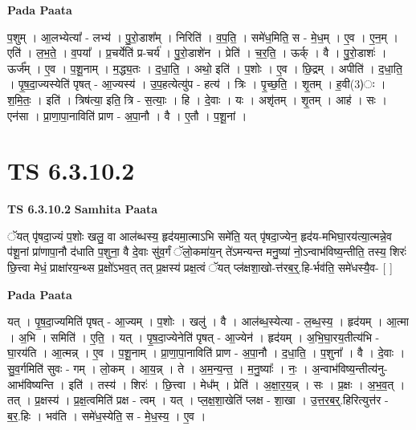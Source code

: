 \documentclass[17pt]{extarticle}
\begin{document}
\textbf{Pada Paata} \newline

प॒शुम् । आ॒लभ्येत्या᳚ - लभ्य॑ । पु॒रो॒डाश᳚म् । निरिति॑ । व॒प॒ति॒ । समे॑ध॒मिति॒ स - मे॒ध॒म् । ए॒व । ए॒न॒म् । एति॑ । ल॒भ॒ते॒ । व॒पया᳚ । प्र॒चर्येति॑ प्र-चर्य॑ । पु॒रो॒डाशे॑न । प्रेति॑ । च॒र॒ति॒ । ऊर्क् । वै । पु॒रो॒डाशः॑ । ऊर्ज᳚म् । ए॒व । प॒शू॒नाम् । म॒द्ध्य॒तः । द॒धा॒ति॒ । अथो॒ इति॑ । प॒शोः । ए॒व । छि॒द्रम् । अपीति॑ । द॒धा॒ति॒ । पृ॒ष॒दा॒ज्यस्येति॑ पृषत् - आ॒ज्यस्य॑ । उ॒प॒हत्येत्यु॑प - हत्य॑ । त्रिः । पृ॒च्छ॒ति॒ । शृ॒तम् । ह॒वी(3)ः । श॒मि॒तः॒ । इति॑ । त्रिष॑त्या॒ इति॒ त्रि - स॒त्याः॒ । हि । दे॒वाः । यः । अशृ॑तम् । शृ॒तम् । आह॑ । सः । एन॑सा । प्रा॒णा॒पा॒नाविति॑ प्राण - अ॒पा॒नौ । वै । ए॒तौ । प॒शू॒नां ।  \newline




\section*{ TS 6.3.10.2 }

\textbf{TS 6.3.10.2 } \newline
\textbf{Samhita Paata} \newline

ॅयत् पृ॑षदा॒ज्यं प॒शोः खलु॒ वा आल॑ब्धस्य॒ हृद॑यमा॒त्माऽभि समे॑ति॒ यत् पृ॑षदा॒ज्येन॒ हृद॑य-मभिघा॒रय॑त्या॒त्मन्ने॒व प॑शू॒नां प्रा॑णापा॒नौ द॑धाति प॒शुना॒ वै दे॒वाः सु॑व॒र्गं ॅलो॒कमा॑य॒न् ते॑ऽमन्यन्त मनु॒ष्या॑ नो॒ऽन्वाभ॑विष्य॒न्तीति॒ तस्य॒ शिरः॑ छि॒त्त्वा मेधं॒ प्राक्षा॑रय॒न्थ्स प्र॒क्षो॑ऽभव॒त् तत् प्र॒क्षस्य॑ प्रक्ष॒त्वं ॅयत् प्ल॑क्षशा॒खो-त्त॑रब॒र्॒.हि-र्भव॑ति॒ समे॑धस्यै॒व- [  ] \newline

\textbf{Pada Paata} \newline

यत् । पृ॒ष॒दा॒ज्यमिति॑ पृषत् - आ॒ज्यम् । प॒शोः । खलु॑ । वै । आल॑ब्ध॒स्येत्या - ल॒ब्ध॒स्य॒ । हृद॑यम् । आ॒त्मा । अ॒भि । समिति॑ । ए॒ति॒ । यत् । पृ॒ष॒दा॒ज्येनेति॑ पृषत् - आ॒ज्येन॑ । हृद॑यम् । अ॒भि॒घा॒रय॒तीत्य॑भि - घा॒रय॑ति । आ॒त्मन्न् । ए॒व । प॒शू॒नाम् । प्रा॒णा॒पा॒नाविति॑ प्राण - अ॒पा॒नौ । द॒धा॒ति॒ । प॒शुना᳚ । वै । दे॒वाः । सु॒व॒र्गमिति॑ सुवः - गम् । लो॒कम् । आ॒य॒न्न् । ते । अ॒म॒न्य॒न्त॒ । म॒नु॒ष्याः᳚ । नः॒ । अ॒न्वाभ॑विष्य॒न्तीत्य॑नु-आभ॑विष्यन्ति । इति॑ । तस्य॑ । शिरः॑ । छि॒त्त्वा । मेध᳚म् । प्रेति॑ । अ॒क्षा॒र॒य॒न्न् । सः । प्र॒क्षः । अ॒भ॒व॒त् । तत् । प्र॒क्षस्य॑ । प्र॒क्ष॒त्वमिति॑ प्रक्ष - त्वम् । यत् । प्ल॒क्ष॒शा॒खेति॑ प्लक्ष - शा॒खा । उ॒त्त॒र॒ब॒र्॒.हिरित्युत्त॑र - ब॒र॒.हिः । भव॑ति । समे॑ध॒स्येति॒ स - मे॒ध॒स्य॒ । ए॒व ।  \newline
\end{document}
